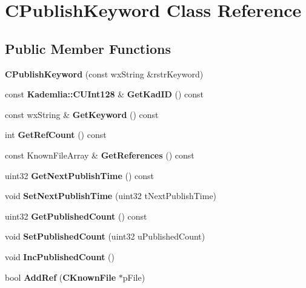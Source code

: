 \section{CPublishKeyword Class Reference}
\label{classCPublishKeyword}
\subsection*{Public Member Functions}
\begin{DoxyCompactItemize}
\item 
{\bfseries CPublishKeyword} (const wxString \&rstrKeyword)\label{classCPublishKeyword_a8461c5d1ecd4bd7169e3e6083b7d1aea}

\item 
const {\bf Kademlia::CUInt128} \& {\bfseries GetKadID} () const \label{classCPublishKeyword_a0cc64e45ba5cc9d052f05eaf4d91ff2e}

\item 
const wxString \& {\bfseries GetKeyword} () const \label{classCPublishKeyword_a31f486aadc0057a84d5fd9713f7cb960}

\item 
int {\bfseries GetRefCount} () const \label{classCPublishKeyword_a09ad52648dbefd459cf6a480e017591f}

\item 
const KnownFileArray \& {\bfseries GetReferences} () const \label{classCPublishKeyword_aca8d10de3a5ddf8d0354d5c47e602d7f}

\item 
uint32 {\bfseries GetNextPublishTime} () const \label{classCPublishKeyword_a78f94b6805d7c6f98cbc0a4d7078e9ad}

\item 
void {\bfseries SetNextPublishTime} (uint32 tNextPublishTime)\label{classCPublishKeyword_a458579090ae16abb73b3e8608fa23f98}

\item 
uint32 {\bfseries GetPublishedCount} () const \label{classCPublishKeyword_a5068d4c48e2cb2500a791e13b37ebd6c}

\item 
void {\bfseries SetPublishedCount} (uint32 uPublishedCount)\label{classCPublishKeyword_ad79bdc808bf2d98b288aee63e0e6fc6b}

\item 
void {\bfseries IncPublishedCount} ()\label{classCPublishKeyword_a45991e9958d49e6046c119ab3ca246ae}

\item 
bool {\bfseries AddRef} ({\bf CKnownFile} $\ast$pFile)\label{classCPublishKeyword_a6e47e258e058d2c653285f3a14c05ea0}


\end{DoxyCompactItemize}
